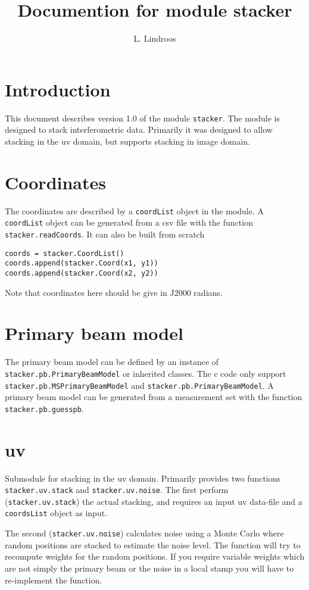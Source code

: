 \documentclass{article}
\title{Documention for module stacker}
\author{L. Lindroos}
\begin{document}
\maketitle

\section{Introduction}
This document describes version 1.0 of the module {\tt stacker}.
The module is designed to stack interferometric data.
Primarily it was designed to allow stacking in the uv domain, 
but supports stacking in image domain.

\section{Coordinates}
The coordinates are described by a {\tt coordList} object in the module.
A {\tt coordList} object can be generated from a csv file with the function {\tt stacker.readCoords}.
It can also be built from scratch
\begin{verbatim}
coords = stacker.CoordList()
coords.append(stacker.Coord(x1, y1))
coords.append(stacker.Coord(x2, y2))
\end{verbatim}
Note that coordinates here should be give in J2000 radians.

\section{Primary beam model}
The primary beam model can be defined by an instance of 
{\tt stacker.pb.PrimaryBeamModel} or inherited classes. The c code only support
{\tt stacker.pb.MSPrimaryBeamModel} and {\tt stacker.pb.PrimaryBeamModel}. 
A primary beam model can be generated from a measurement set with the function
{\tt stacker.pb.guesspb}.

\section{uv}
Submodule for stacking in the uv domain. 
Primarily provides two functions {\tt stacker.uv.stack} and {\tt stacker.uv.noise}.
The first perform ({\tt stacker.uv.stack}) the actual stacking, 
and requires an input uv data-file and a {\tt coordsList} object as input.

The second ({\tt stacker.uv.noise}) calculates noise using a Monte Carlo
where random positions are stacked to estimate the noise level. 
The function will try to recompute weights for the random positions.
If you require variable weights which are not simply the primary beam
or the noise in a local stamp you will have to re-implement the function.
\end{document}
